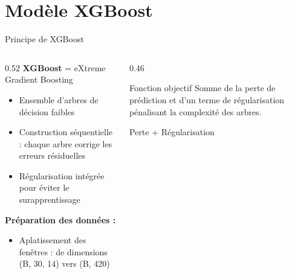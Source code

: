 \documentclass[aspectratio=169,11pt]{beamer}
\begin{document}
\section{Modèle XGBoost}

\begin{frame}{Principe de XGBoost}
\begin{columns}[T]
\begin{column}{0.52\textwidth}
\textbf{XGBoost} = eXtreme Gradient Boosting
\vspace{0.2cm}
\begin{itemize}
    \item Ensemble d'arbres de décision faibles
    \item Construction séquentielle : chaque arbre corrige les erreurs résiduelles
    \item Régularisation intégrée pour éviter le surapprentissage
\end{itemize}
\vspace{0.3cm}
\textbf{Préparation des données :}
\begin{itemize}
    \item Aplatissement des fenêtres : de dimensions (B, 30, 14) vers (B, 420)
\end{itemize}
\end{column}
\begin{column}{0.46\textwidth}
\begin{block}{Fonction objectif}
\centering
Somme de la perte de prédiction et d'un terme de régularisation pénalisant la complexité des arbres.
\vspace{0.1cm}

Perte + Régularisation
\end{block}
\end{column}
\end{columns}
\end{frame}
\end{document}
